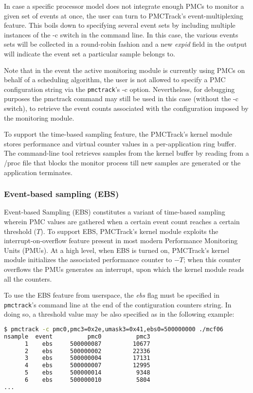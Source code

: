 In case a specific processor model does not integrate enough PMCs to
monitor a given set of events at once, the user can turn to PMCTrack's
event-multiplexing feature. This boils down to specifying several event
sets by including multiple instances of the -c switch in the command
line. In this case, the various events sets will be collected in a
round-robin fashion and a new \textit{expid} field in the output will
indicate the event set a particular sample belongs to.

Note that in the event the active monitoring module is currently using
PMCs on behalf of a scheduling algorithm, the user is not allowed to
specify a PMC configuration string via the \texttt{pmctrack}'s -c
option. Nevertheless, for debugging purposes the pmctrack command may
still be used in this case (without the -c switch), to retrieve the
event counts associated with the configuration imposed by the monitoring
module.

To support the time-based sampling feature, the PMCTrack's kernel module
stores performance and virtual counter values in a per-application ring
buffer. The command-line tool retrieves samples from the kernel buffer
by reading from a /proc file that blocks the monitor process till new
samples are generated or the application terminates.

\subsubsection{Event-based sampling
(EBS)}\label{event-based-sampling-ebs}

Event-based Sampling (EBS) constitutes a variant of time-based sampling
wherein PMC values are gathered when a certain event count reaches a
certain threshold ($T$). To support EBS, PMCTrack's kernel module
exploits the interrupt-on-overflow feature present in most modern
Performance Monitoring Units (PMUs). At a high level, when EBS is turned
on, PMCTrack's kernel module initializes the associated performance
counter to $-T$; when this counter overflows the PMUs generates an
interrupt, upon which the kernel module reads all the counters.

To use the EBS feature from userspace, the \textit{ebs} flag must be
specified in \texttt{pmctrack}'s command line at the end of the
contiguration counters string. In doing so, a threshold value may be
also specified as in the following example:

\begin{lstlisting}[language=bash,basicstyle=\tt\scriptsize]
$ pmctrack -c pmc0,pmc3=0x2e,umask3=0x41,ebs0=500000000 ./mcf06
nsample  event          pmc0          pmc3
      1    ebs     500000087         10677
      2    ebs     500000002         22336
      3    ebs     500000004         17131
      4    ebs     500000007         12995
      5    ebs     500000014          9348
      6    ebs     500000010          5804
...
\end{lstlisting}

